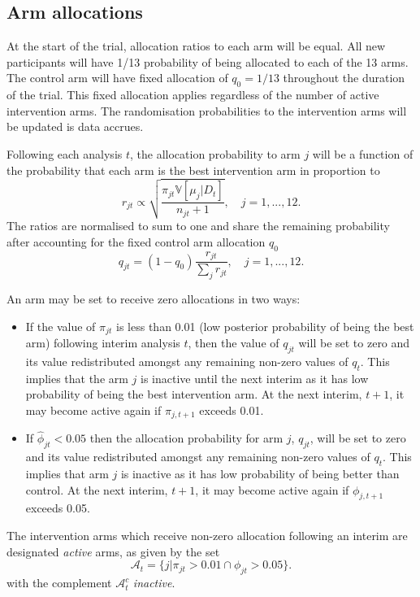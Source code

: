 \documentclass[
  bibliography=totoc]{scrreprt}
\providecommand{\tightlist}{%
  \setlength{\itemsep}{0pt}\setlength{\parskip}{0pt}}
\begin{document}
\hypertarget{arm-allocations}{%
\subsection{Arm allocations}\label{arm-allocations}}

At the start of the trial, allocation ratios to each arm will be equal.
All new participants will have 1/13 probability of being allocated to each of the 13 arms.
The control arm will have fixed allocation of \(q_0=1/13\) throughout the duration of the trial.
This fixed allocation applies regardless of the number of active intervention arms.
The randomisation probabilities to the intervention arms will be updated is data accrues.

Following each analysis \(t\), the allocation probability to arm \(j\) will be a function of the probability that each arm is the best intervention arm in proportion to
\[
r_{jt} \propto \sqrt{\frac{\pi_{jt}\mathbb V[\mu_j|D_t]}{n_{jt} + 1}},\quad j=1,...,12.
\]
The ratios are normalised to sum to one and share the remaining probability after accounting for the fixed control arm allocation \(q_0\)
\[
q_{jt} = (1 - q_0)\frac{r_{jt}}{\sum_j r_{jt}},\quad j=1,...,12.
\]

An arm may be set to receive zero allocations in two ways:

\begin{itemize}
\tightlist
\item
  If the value of \(\pi_{jt}\) is less than 0.01 (low posterior probability of being the best arm) following interim analysis \(t\), then the value of \(q_{jt}\) will be set to zero and its value redistributed amongst any remaining non-zero values of \(q_t\).
  This implies that the arm \(j\) is inactive until the next interim as it has low probability of being the best intervention arm.
  At the next interim, \(t+1\), it may become active again if \(\pi_{j,t+1}\) exceeds 0.01.
\item
  If \(\hat\phi_{jt}<0.05\) then the allocation probability for arm \(j\), \(q_{jt}\), will be set to zero and its value redistributed amongst any remaining non-zero values of \(q_t\).
  This implies that arm \(j\) is inactive as it has low probability of being better than control.
  At the next interim, \(t+1\), it may become active again if \(\phi_{j,t+1}\) exceeds 0.05.
\end{itemize}

The intervention arms which receive non-zero allocation following an interim are designated \emph{active} arms, as given by the set
\[
\mathcal{A}_{t} = \{j|\pi_{jt} > 0.01 \cap \phi_{jt}>0.05\}.
\]
with the complement \(\mathcal{A}_t^c\) \emph{inactive}.
\end{document}
